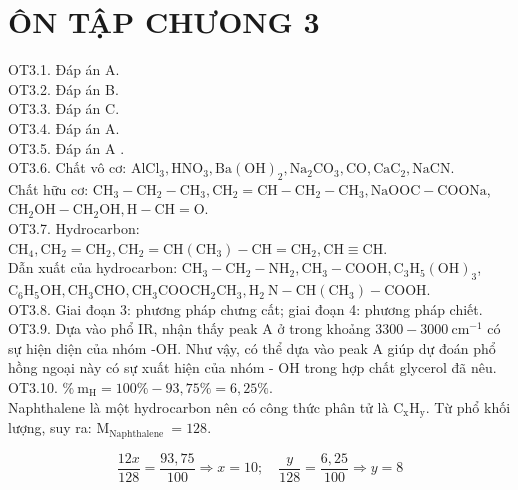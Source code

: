 \documentclass[10pt]{article}
\begin{document}
\section*{ÔN TẬP CHƯONG 3}
OT3.1. Đáp án A.\\
OT3.2. Đáp án B.\\
OT3.3. Đáp án C.\\
OT3.4. Đáp án A.\\
OT3.5. Đáp án A .\\
OT3.6. Chất vô cơ: $\mathrm{AlCl}_{3}, \mathrm{HNO}_{3}, \mathrm{Ba}(\mathrm{OH})_{2}, \mathrm{Na}_{2} \mathrm{CO}_{3}, \mathrm{CO}, \mathrm{CaC}_{2}, \mathrm{NaCN}$.\\
Chất hữu cơ: $\mathrm{CH}_{3}-\mathrm{CH}_{2}-\mathrm{CH}_{3}, \mathrm{CH}_{2}=\mathrm{CH}-\mathrm{CH}_{2}-\mathrm{CH}_{3}, \mathrm{NaOOC}-\mathrm{COONa}$, $\mathrm{CH}_{2} \mathrm{OH}-\mathrm{CH}_{2} \mathrm{OH}, \mathrm{H}-\mathrm{CH}=\mathrm{O}$.\\
OT3.7. Hydrocarbon: $\mathrm{CH}_{4}, \mathrm{CH}_{2}=\mathrm{CH}_{2}, \mathrm{CH}_{2}=\mathrm{CH}\left(\mathrm{CH}_{3}\right)-\mathrm{CH}=\mathrm{CH}_{2}, \mathrm{CH} \equiv \mathrm{CH}$.\\
Dẫn xuất của hydrocarbon: $\mathrm{CH}_{3}-\mathrm{CH}_{2}-\mathrm{NH}_{2}, \mathrm{CH}_{3}-\mathrm{COOH}, \mathrm{C}_{3} \mathrm{H}_{5}(\mathrm{OH})_{3}$, $\mathrm{C}_{6} \mathrm{H}_{5} \mathrm{OH}, \mathrm{CH}_{3} \mathrm{CHO}, \mathrm{CH}_{3} \mathrm{COOCH}_{2} \mathrm{CH}_{3}, \mathrm{H}_{2} \mathrm{~N}-\mathrm{CH}\left(\mathrm{CH}_{3}\right)-\mathrm{COOH}$.\\
OT3.8. Giai đoạn 3: phương pháp chưng cất; giai đoạn 4: phương pháp chiết.\\
OT3.9. Dựa vào phổ IR, nhận thấy peak A ở trong khoảng $3300-3000 \mathrm{~cm}^{-1}$ có sự hiện diện của nhóm -OH. Như vậy, có thể dựa vào peak A giúp dự đoán phổ hồng ngoại này có sự xuất hiện của nhóm - OH trong hợp chất glycerol đã nêu.\\
OT3.10. $\% \mathrm{~m}_{\mathrm{H}}=100 \%-93,75 \%=6,25 \%$.\\
Naphthalene là một hydrocarbon nên có công thức phân tử là $\mathrm{C}_{\mathrm{x}} \mathrm{H}_{\mathrm{y}}$. Từ phổ khối lượng, suy ra: $\mathrm{M}_{\text {Naphthalene }}=128$.

$$
\frac{12 x}{128}=\frac{93,75}{100} \Rightarrow x=10 ; \quad \frac{y}{128}=\frac{6,25}{100} \Rightarrow y=8
$$
\end{document}
